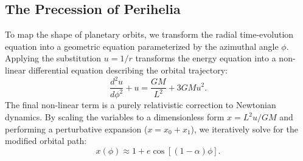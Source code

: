 \documentclass[11pt, a4paper]{report}
\begin{document}
\subsection{The Precession of Perihelia}
To map the shape of planetary orbits, we transform the radial time-evolution equation into a geometric equation parameterized by the azimuthal angle $\phi$. Applying the substitution $u = 1/r$ transforms the energy equation into a non-linear differential equation describing the orbital trajectory:
\begin{equation}
\frac{d^{2}u}{d\phi^{2}} + u = \frac{GM}{L^{2}} + 3GMu^{2}.
\end{equation}
The final non-linear term is a purely relativistic correction to Newtonian dynamics. By scaling the variables to a dimensionless form $x = L^2 u / GM$ and performing a perturbative expansion ($x = x_0 + x_1$), we iteratively solve for the modified orbital path:
\begin{equation}
\label{eq:precession_phase}
x(\phi) \approx 1 + e \cos[(1-\alpha)\phi].
\end{equation}
\end{document}
